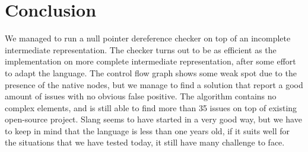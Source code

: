 \section{Conclusion}
\label{sec:conclusion}
We managed to run a null pointer dereference checker on top of an incomplete intermediate representation. 
The checker turns out to be as efficient as the implementation on more complete intermediate representation, after some effort to adapt the language. 
The control flow graph shows some weak spot due to the presence of the native nodes, but we manage to find a solution that report a good amount of issues with no obvious false positive. 
The algorithm contains no complex elements, and is still able to find more than 35 issues on top of existing open-source project.
\newline
[...]
\newline
Slang seems to have started in a very good way, but we have to keep in mind that the language is less than one years old, if it suits well for the situations that we have tested today, it still have many challenge to face.
